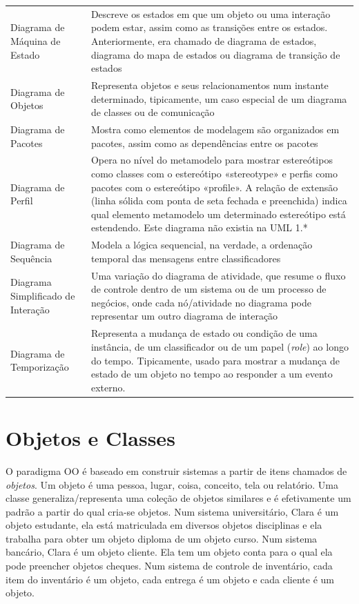 \documentclass[
	11pt,				%
	openright,
	twoside,			%
	a4paper,			%
	english,			%
	french,
	brazil,				%
	sumario=tradicional
	]{abntex2}
\begin{document}
\begin{longtable}[l]{p{4.7cm}p{11cm}}
Diagrama de Máquina de Estado & Descreve os estados em que um objeto ou uma interação podem estar, assim como as transições entre os estados. Anteriormente, era chamado de diagrama de estados, diagrama do mapa de estados ou diagrama de transição de estados  \\

Diagrama de Objetos & Representa objetos e seus relacionamentos num instante determinado, tipicamente, um caso especial de um diagrama de classes ou de comunicação \\

Diagrama de Pacotes & Mostra como elementos de modelagem são organizados em pacotes, assim como as dependências entre os pacotes \\

Diagrama de Perfil & Opera no nível do metamodelo para mostrar estereótipos como classes com o estereótipo «stereotype» e perfis como pacotes com o estereótipo «profile». A relação de extensão (linha sólida com ponta de seta fechada e preenchida) indica qual elemento metamodelo um determinado estereótipo está estendendo. Este diagrama não existia na UML 1.* \\

Diagrama de Sequência & Modela a lógica sequencial, na verdade, a ordenação temporal das mensagens entre classificadores \\

Diagrama Simplificado de Interação & Uma variação do diagrama de atividade, que resume o fluxo de controle dentro de um sistema ou de um processo de negócios, onde cada nó/atividade no diagrama pode representar um outro diagrama de interação \\

Diagrama de Temporização & Representa a mudança de estado ou condição de uma instância, de um classificador ou de um papel (\textit{role}) ao longo do tempo. Tipicamente, usado para mostrar a mudança de estado de um objeto no tempo ao responder a um evento externo. \\

\end{longtable}

\section{Objetos e Classes}

O paradigma OO é baseado em construir sistemas a partir de itens chamados de \emph{objetos}. Um objeto é uma pessoa, lugar, coisa, conceito, tela ou relatório. Uma classe generaliza/representa uma coleção de objetos similares e é efetivamente um padrão a partir do qual cria-se objetos. Num sistema universitário, Clara é um objeto estudante, ela está matriculada em diversos objetos disciplinas e ela trabalha para obter um objeto diploma de um objeto curso. Num sistema bancário, Clara é um objeto cliente. Ela tem um objeto conta para o qual ela pode preencher objetos cheques. Num sistema de controle de inventário, cada item do inventário é um objeto, cada entrega é um objeto e cada cliente é um objeto.
\end{document}
